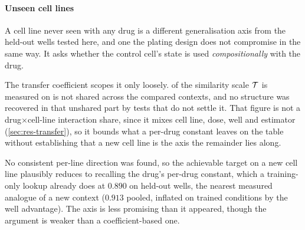 \paragraph{Unseen cell lines} A cell line never seen with any drug is a
different generalisation axis from the held-out wells tested here, and one the
plating design does not compromise in the same way. It asks whether the control
cell's state is used \emph{compositionally} with the
drug.

The transfer coefficient scopes it only loosely.  of
the similarity scale $\mathcal{T}$ is measured on is not shared across the compared
contexts, and no structure was recovered in that unshared part by tests that do
not settle it. That figure is not a drug$\times$cell-line interaction share,
since it mixes cell line, dose, well and estimator (\cref{sec:res-transfer}), so
it bounds what a per-drug constant leaves on the table without establishing that
a new cell line is the axis the remainder lies along.

No consistent per-line direction was found, so the achievable target on a new
cell line plausibly reduces to recalling the drug's per-drug constant, which a
training-only lookup already does at $0.890$ on held-out wells, the nearest
measured analogue of a new context ($0.913$ pooled, inflated on trained
conditions by the well advantage). The axis is less promising than it appeared,
though the argument is weaker than a coefficient-based one.

